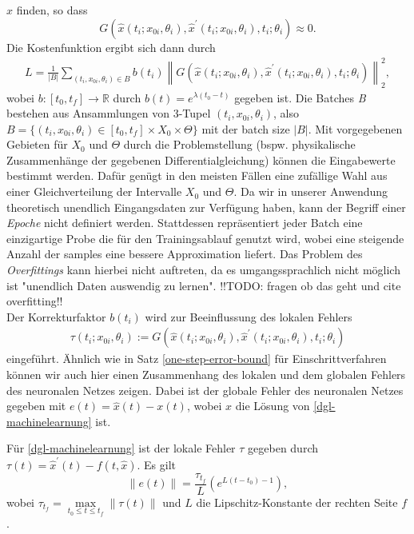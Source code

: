 $\hat{x}$ finden, so dass
\[
    G(\hat{x}(t_i;x_{0i},\theta_i), \hat{x}^{\prime}(t_i;x_{0i},\theta_i),t_i;\theta_i) \approx 0.
\]
Die Kostenfunktion ergibt sich dann durch
\begin{align}
    \label{cost-func}
    L = \frac{1}{|B|} \sum_{(t_i,x_{0i},\theta_i) \in B} b(t_i)
    \left\lVert G(\hat{x}(t_i;x_{0i},\theta_i), \hat{x}^{\prime}(t_i;x_{0i},\theta_i),t_i;\theta_i) \right\rVert_2^2,
\end{align}
wobei $b:[t_0,t_f] \rightarrow \mathbb{R}$ durch $b(t) = e^{\lambda (t_0 - t)}$ gegeben ist. Die Batches \textit{B}
bestehen aus Ansammlungen von 3-Tupel $(t_i,x_{0i},\theta_i)$, also
$B=\{(t_i,x_{0i},\theta_i) \in [t_0,t_f] \times X_0 \times \Theta\}$ mit der batch size $|B|$. Mit vorgegebenen Gebieten
für $X_0$ und $\Theta$ durch die Problemstellung (bspw. physikalische Zusammenhänge der gegebenen Differentialgleichung)
können die Eingabewerte bestimmt werden. Dafür genügt in den meisten Fällen eine zufällige Wahl aus einer
Gleichverteilung der Intervalle $X_0$ und $\Theta$. Da wir in unserer Anwendung theoretisch unendlich Eingangsdaten zur
Verfügung haben, kann der Begriff einer \textit{Epoche} nicht definiert werden. Stattdessen repräsentiert jeder Batch
eine einzigartige Probe die für den Trainingsablauf genutzt wird, wobei eine steigende Anzahl der samples eine bessere
Approximation liefert. Das Problem des \textit{Overfittings} kann hierbei nicht auftreten, da es umgangssprachlich nicht
möglich ist "unendlich Daten auswendig zu lernen". !!TODO: fragen ob das geht und cite overfitting!!\\
Der Korrekturfaktor $b(t_i)$ wird zur Beeinflussung des lokalen Fehlers
\begin{align*}
    \tau(t_i;x_{0i}, \theta_i)
    := G \left( \hat{x}(t_i;x_{0i}, \theta_i), \hat{x}^{\prime}(t_i;x_{0i}, \theta_i),t_i;\theta_i \right)
\end{align*}
eingeführt. Ähnlich wie in Satz \eqref{one-step-error-bound} für Einschrittverfahren können wir auch hier einen
Zusammenhang des lokalen und dem globalen Fehlers des neuronalen Netzes zeigen. Dabei ist der globale Fehler des
neuronalen Netzes gegeben mit $e(t) = \hat{x}(t) - x(t)$, wobei $x$ die Lösung von \eqref{dgl-machinelearnung} ist.
\begin{satz}
    Für \eqref{dgl-machinelearnung} ist der lokale Fehler $\tau$ gegeben durch
    $\tau(t) = \hat{x}^{\prime}(t) - f(t,\hat{x})$. Es gilt
    \[
        \left\lVert e(t) \right\rVert = \frac{\tau_{t_f}}{L} \left( e^{L(t-t_0) - 1} \right),
    \]
    wobei $\tau_{t_f} = \max\limits_{t_0 \leq t \leq t_f} \left\lVert \tau(t) \right\rVert$ und $L$ die
    Lipschitz-Konstante der rechten Seite $f$.
\end{satz}
